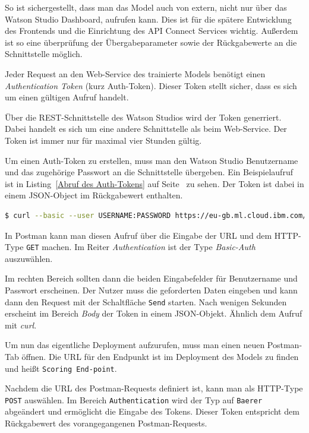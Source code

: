 So ist sichergestellt, dass man das Model auch von extern, nicht nur über das Watson Studio Dashboard, aufrufen kann.
Dies ist für die spätere Entwicklung des Frontends und die Einrichtung des API Connect Services wichtig. Außerdem ist
so eine überprüfung der Übergabeparameter sowie der Rückgabewerte an die Schnittstelle möglich.

Jeder Request an den Web-Service des trainierte Models benötigt einen \textit{Authentication Token} (kurz Auth-Token).
Dieser Token stellt sicher, dass es sich um einen gültigen Aufruf handelt.

Über die REST-Schnittstelle des Watson Studios wird der Token generriert. Dabei handelt es sich um eine andere
Schnittstelle als beim Web-Service. Der Token ist immer nur für maximal vier Stunden gültig.

Um einen Auth-Token zu erstellen, muss man den Watson Studio Benutzername und das zugehörige Passwort an die Schnittstelle
übergeben. Ein Beispielaufruf ist in Listing~\ref{Abruf des Auth-Tokens} auf Seite~\pageref{Abruf des Auth-Tokens}
zu sehen. Der Token ist dabei in einem JSON-Object im Rückgabewert enthalten.

\begin{lstlisting}[language=bash, caption=Abruf des Auth-Tokens, label=Abruf des Auth-Tokens]
$ curl --basic --user USERNAME:PASSWORD https://eu-gb.ml.cloud.ibm.com/v3/identity/token
\end{lstlisting}

In Postman kann man diesen Aufruf über die Eingabe der URL und dem HTTP-Type \texttt{GET} machen. Im Reiter
\textit{Authentication} ist der Type \textit{Basic-Auth} auszuwählen.

Im rechten Bereich sollten dann die beiden Eingabefelder für Benutzername und Passwort erscheinen. Der Nutzer muss die
geforderten Daten eingeben und kann dann den Request mit der Schaltfläche \texttt{Send} starten. Nach wenigen Sekunden
erscheint im Bereich \textit{Body} der Token in einem JSON-Objekt. Ähnlich dem Aufruf mit \textit{curl}.

Um nun das eigentliche Deployment aufzurufen, muss man einen neuen Postman-Tab öffnen. Die URL für den Endpunkt ist im
Deployment des Models zu finden und heißt \texttt{Scoring End-point}.

Nachdem die URL des Postman-Requests definiert ist, kann man als HTTP-Type \texttt{POST} auswählen. Im Bereich
\texttt{Authentication} wird der Typ auf \texttt{Baerer} abgeändert und ermöglicht die Eingabe des Tokens. Dieser Token
entspricht dem Rückgabewert des vorangegangenen Postman-Requests.

